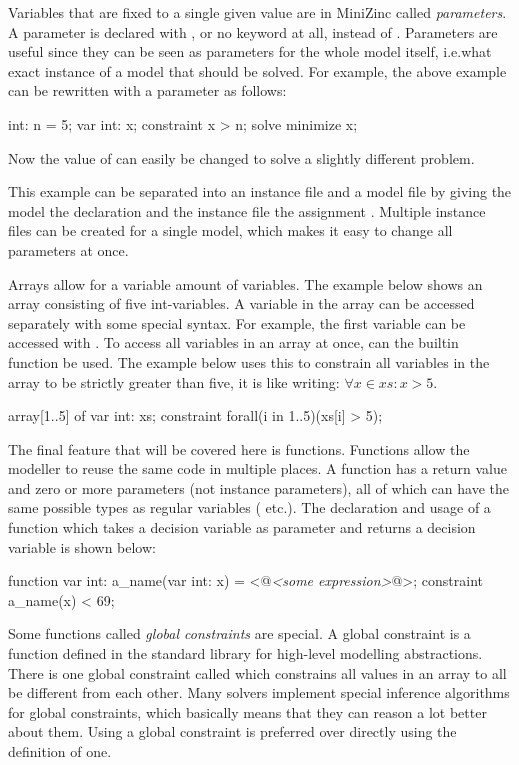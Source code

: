 \documentclass[a4paper,12pt]{article}
\begin{document}
Variables that are fixed to a single given value are in MiniZinc called \emph{parameters}.
A parameter is declared with , or no keyword at all, instead of .
Parameters are useful since they can be seen as parameters for the whole model itself,
i.e.\@ what exact instance of a model that should be solved.
For example, the above example can be rewritten with a parameter as follows:
\begin{mznnobreak}
int: n = 5;
var int: x;
constraint x > n;
solve minimize x;
\end{mznnobreak}
Now the value of  can easily be changed to solve a slightly different problem.

This example can be separated into an instance file and a model file by giving
the model the declaration {} and the
instance file the assignment . Multiple instance files can be created
for a single model, which makes it easy to change all parameters at once.

Arrays allow for a variable amount of variables. The example below shows an array 
consisting of five int-variables. A variable in the array can be accessed separately with
some special syntax. For example, the first variable can be accessed with
.
To access all variables in an array at once, can the builtin function  be used.
The example below uses this to constrain all variables in the array to be strictly greater
than five, it is like writing: $\forall x \in xs : x > 5$.
\begin{mznnobreak}
array[1..5] of var int: xs;
constraint forall(i in 1..5)(xs[i] > 5);
\end{mznnobreak}

The final feature that will be covered here is functions. Functions allow the modeller to
reuse the same code in multiple places. A function has a return value and zero or more
parameters (not instance parameters), all of which can have the same possible types as
regular variables ( etc.). The declaration and usage of a function which takes a decision variable as
parameter and returns a decision variable is shown below:
\begin{mznnobreak}
function var int: a_name(var int: x) = <@\textit{<some expression>}@>;
constraint a_name(x) < 69;
\end{mznnobreak}

Some functions called \emph{global constraints} are special. A global constraint is a
function defined in the standard library for high-level modelling abstractions. There is
one global constraint called  which constrains all values in an array to
all be different from each other. Many solvers implement special inference algorithms for
global constraints, which basically means that they can reason a lot better about them.
Using a global constraint is preferred over directly using the definition of one.
\end{document}
